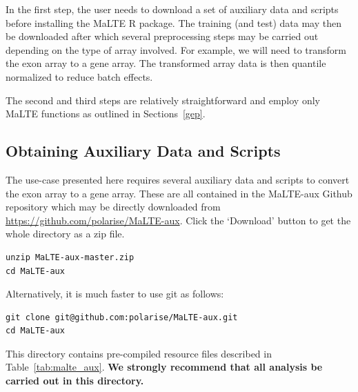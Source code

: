 \documentclass[a4paper,12pt]{article}
\begin{document}
In the first step, the user needs to download a set of auxiliary data and scripts before installing the \textsf{MaLTE} \textsf{R} package. The training (and test) data may then be downloaded after which several preprocessing steps may be carried out depending on the type of array involved. For example, we will need to transform the exon array to a gene array. The transformed array data is then quantile normalized to reduce batch effects.

The second and third steps are relatively straightforward and employ only \textsf{MaLTE} functions as outlined in Sections~\ref{gep}.

\subsection{Obtaining Auxiliary Data and Scripts}
\label{usecase:obtaining}

The use-case presented here requires several auxiliary data and scripts to convert the exon array to a gene array. These are all contained in the \textsf{MaLTE-aux} Github repository which may be directly downloaded from \url{https://github.com/polarise/MaLTE-aux}. Click the `Download' button  to get the whole directory as a zip file.

\begin{verbatim}
unzip MaLTE-aux-master.zip
cd MaLTE-aux
\end{verbatim}

Alternatively, it is much faster to use \textsf{git} as follows: 

\begin{verbatim}
git clone git@github.com:polarise/MaLTE-aux.git
cd MaLTE-aux
\end{verbatim}

This directory contains pre-compiled resource files described in Table~\ref{tab:malte_aux}. \textbf{We strongly recommend that all analysis be carried out in this directory.}
\end{document}
